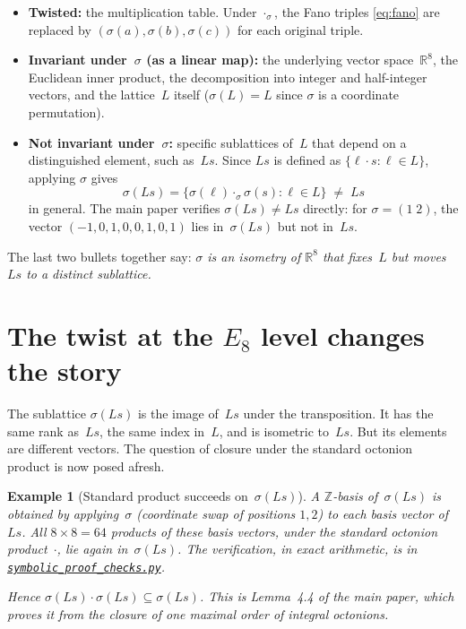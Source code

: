\documentclass[11pt]{amsart}
\newcommand{\ZZ}{\mathbb{Z}}
\newcommand{\RR}{\mathbb{R}}
\newtheorem{example}{Example}[section]
\begin{document}
\begin{itemize}
\item \textbf{Twisted:} the multiplication table.  Under
  $\cdot_\sigma$, the Fano triples \eqref{eq:fano} are replaced by
  $(\sigma(a), \sigma(b), \sigma(c))$ for each original triple.
\item \textbf{Invariant under~$\sigma$ (as a linear map):}
  the underlying vector space~$\RR^8$, the Euclidean inner product,
  the decomposition into integer and half-integer vectors, and the
  lattice~$L$ itself ($\sigma(L) = L$ since $\sigma$ is a coordinate
  permutation).
\item \textbf{Not invariant under~$\sigma$:} specific sublattices
  of~$L$ that depend on a distinguished element, such as~$Ls$.
  Since $Ls$ is defined as $\{\ell \cdot s : \ell \in L\}$, applying
  $\sigma$ gives
  \[
    \sigma(Ls) = \{\sigma(\ell) \cdot_{\sigma} \sigma(s)
                    : \ell \in L\}
    \;\ne\; Ls
  \]
  in general.  The main paper verifies $\sigma(Ls) \ne Ls$
  directly: for $\sigma = (1\;2)$, the vector
  $(-1, 0, 1, 0, 0, 1, 0, 1)$ lies in~$\sigma(Ls)$ but not
  in~$Ls$.
\end{itemize}

The last two bullets together say: \emph{$\sigma$ is an isometry of
$\RR^8$ that fixes~$L$ but moves~$Ls$ to a distinct sublattice.}

\section{The twist at the $E_8$ level changes the story}

The sublattice $\sigma(Ls)$ is the image of~$Ls$ under the
transposition.  It has the same rank as~$Ls$, the same index in~$L$,
and is isometric to~$Ls$.  But its elements are different vectors.
The question of closure under the standard octonion product is now
posed afresh.

\begin{example}[Standard product succeeds on~$\sigma(Ls)$]
\label{ex:sigmaLs-succeeds}
A $\ZZ$-basis of~$\sigma(Ls)$ is obtained by applying~$\sigma$
(coordinate swap of positions $1, 2$) to each basis vector of~$Ls$.
All $8 \times 8 = 64$ products of these basis vectors, under the
standard octonion product~$\cdot$, lie again in~$\sigma(Ls)$.  The
verification, in exact arithmetic, is in
\href{../python_project/src/symbolic_proof_checks.py}{\texttt{symbolic\_proof\_checks.py}}.

Hence $\sigma(Ls) \cdot \sigma(Ls) \subseteq \sigma(Ls)$.  This is
Lemma~4.4 of the main paper, which proves it from the closure of one
maximal order of integral octonions.
\end{example}
\end{document}
